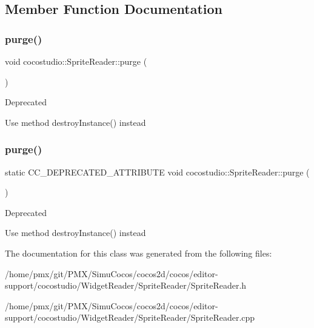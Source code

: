 \subsection{Member Function Documentation}
\mbox{\label{classcocostudio_1_1SpriteReader_a92d206fdf2e9d6127be5cdfd4d4841d4}} 
\subsubsection{\texorpdfstring{purge()}{purge()}\hspace{0.1cm}{\footnotesize\ttfamily [1/2]}}
{\footnotesize\ttfamily void cocostudio\+::\+Sprite\+Reader\+::purge (\begin{DoxyParamCaption}{ }\end{DoxyParamCaption})\hspace{0.3cm}{\ttfamily [static]}}

\begin{DoxyRefDesc}{Deprecated}
\item[\hyperlink{deprecated__deprecated000106}{Deprecated}]Use method destroy\+Instance() instead \end{DoxyRefDesc}
\mbox{\label{classcocostudio_1_1SpriteReader_a113f0de09d0a7bcfb250466df232e891}} 
\subsubsection{\texorpdfstring{purge()}{purge()}\hspace{0.1cm}{\footnotesize\ttfamily [2/2]}}
{\footnotesize\ttfamily static C\+C\+\_\+\+D\+E\+P\+R\+E\+C\+A\+T\+E\+D\+\_\+\+A\+T\+T\+R\+I\+B\+U\+TE void cocostudio\+::\+Sprite\+Reader\+::purge (\begin{DoxyParamCaption}{ }\end{DoxyParamCaption})\hspace{0.3cm}{\ttfamily [static]}}

\begin{DoxyRefDesc}{Deprecated}
\item[\hyperlink{deprecated__deprecated000341}{Deprecated}]Use method destroy\+Instance() instead \end{DoxyRefDesc}


The documentation for this class was generated from the following files\+:\begin{DoxyCompactItemize}
\item 
/home/pmx/git/\+P\+M\+X/\+Simu\+Cocos/cocos2d/cocos/editor-\/support/cocostudio/\+Widget\+Reader/\+Sprite\+Reader/Sprite\+Reader.\+h\item 
/home/pmx/git/\+P\+M\+X/\+Simu\+Cocos/cocos2d/cocos/editor-\/support/cocostudio/\+Widget\+Reader/\+Sprite\+Reader/Sprite\+Reader.\+cpp\end{DoxyCompactItemize}
